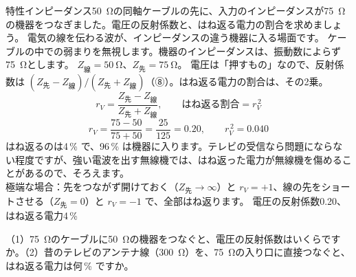 \label{ph:波-7:ex7}
\begin{phreidai}
特性インピーダンス\qty{50}{\ohm}の同軸ケーブルの先に、入力のインピーダンスが\qty{75}{\ohm}の機器をつなぎました。電圧の反射係数と、はね返る電力の割合を求めましょう。
\phbamen
電気の線を伝わる波が、インピーダンスの違う機器に入る場面です。
\phmushi
ケーブルの中での弱まりを無視します。機器のインピーダンスは、振動数によらず\qty{75}{\ohm}とします。
\phzu
$Z_{\text{線}}=\qty{50}{\ohm}$、$Z_{\text{先}}=\qty{75}{\ohm}$。
\phriyu
電圧は「押すもの」なので、反射係数は $(Z_{\text{先}}-Z_{\text{線}})/(Z_{\text{先}}+Z_{\text{線}})$（⑧）。はね返る電力の割合は、その2乗。
\phtateru
\[r_V=\frac{Z_{\text{先}}-Z_{\text{線}}}{Z_{\text{先}}+Z_{\text{線}}},\qquad\text{はね返る割合}=r_V^{\,2}\]
\phtoku
\[r_V=\frac{75-50}{75+50}=\frac{25}{125}=0.20,\qquad r_V^{\,2}=0.040\]
\phtashikame
はね返るのは4\,\% で、96\,\% は機器に入ります。テレビの受信なら問題にならない程度ですが、強い電波を出す無線機では、はね返った電力が無線機を傷めることがあるので、そろえます。\\
極端な場合：先をつながず開けておく（$Z_{\text{先}}\to\infty$）と $r_V=+1$、線の先をショートさせる（$Z_{\text{先}}=0$）と $r_V=-1$ で、全部はね返ります。
\kotae 電圧の反射係数0.20、はね返る電力4\,\%
\end{phreidai}
\begin{jibun}
（1）\qty{75}{\ohm}のケーブルに\qty{50}{\ohm}の機器をつなぐと、電圧の反射係数はいくらですか。（2）昔のテレビのアンテナ線（\qty{300}{\ohm}）を、\qty{75}{\ohm}の入り口に直接つなぐと、はね返る電力は何\,\% ですか。
\end{jibun}

